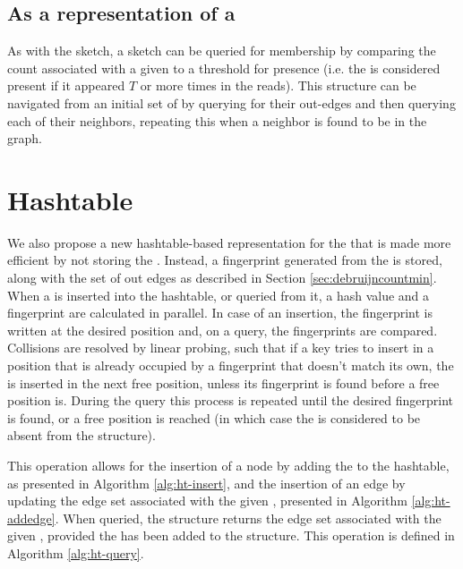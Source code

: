 \subsection{As a representation of a \dBG}

As with the \cm sketch, a \dBCM sketch can be queried for membership by comparing the count associated with a given \kmer to a threshold
for presence (i.e. the \kmer is considered present if it appeared $T$ or more times in the reads). This structure can be navigated from
an initial set of \kmers by querying for their out-edges and then querying each of their neighbors, repeating this when a neighbor is
found to be in the graph. 

\section{Hashtable}
\label{sec:debruijnhashtable}

We also propose a new hashtable-based representation for the \dBG that is made more efficient by not storing the \kmer. Instead,
a fingerprint generated from the \kmer is stored, along with the set of out edges as described in Section \ref{sec:debruijncountmin}.
When a \kmer is inserted into the hashtable, or queried from it, a hash value and a fingerprint are calculated in parallel.
In case of an insertion, the fingerprint is written at the desired position and, on a query, the fingerprints are compared. Collisions
are resolved by linear probing, such that if a key tries to insert in a position that is already occupied by a fingerprint that doesn't 
match its own, the \kmer is inserted in the next free position, unless its fingerprint is found before a free position is. During the
query this process is repeated until the desired fingerprint is found, or a free position is reached (in which case the \kmer is
considered to be absent from the structure).

This operation allows for the insertion of a node by adding the \kmer to the hashtable, as presented in Algorithm \ref{alg:ht-insert},
and the insertion of an edge by updating the edge set associated with the given \kmer, presented in Algorithm \ref{alg:ht-addedge}.
When queried, the structure returns the edge set associated with the given \kmer, provided the \kmer has been added to the structure.
This operation is defined in Algorithm \ref{alg:ht-query}.

